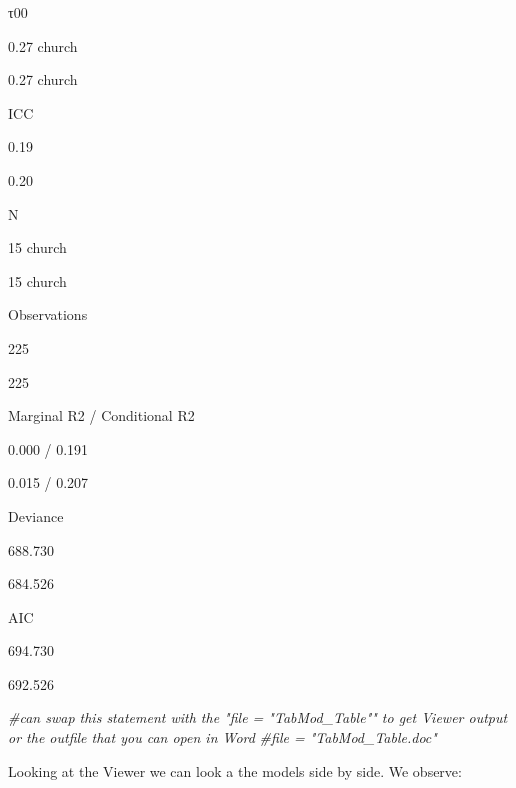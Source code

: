 \documentclass[
  11pt,
]{book}
\newenvironment{Shaded}{\begin{snugshade}}{\end{snugshade}}
\newcommand{\CommentTok}[1]{\textcolor[rgb]{0.56,0.35,0.01}{\textit{#1}}}
\begin{document}
τ00

0.27 church

0.27 church

ICC

0.19

0.20

N

15 church

15 church

Observations

225

225

Marginal R2 / Conditional R2

0.000 / 0.191

0.015 / 0.207

Deviance

688.730

684.526

AIC

694.730

692.526

\begin{Shaded}
\begin{Highlighting}[]
\CommentTok{\#can swap this statement with the "file = "TabMod\_Table"" to get Viewer output or the outfile that you can open in Word}
\CommentTok{\#file = "TabMod\_Table.doc"}
\end{Highlighting}
\end{Shaded}

Looking at the Viewer we can look a the models side by side. We observe:
\end{document}
